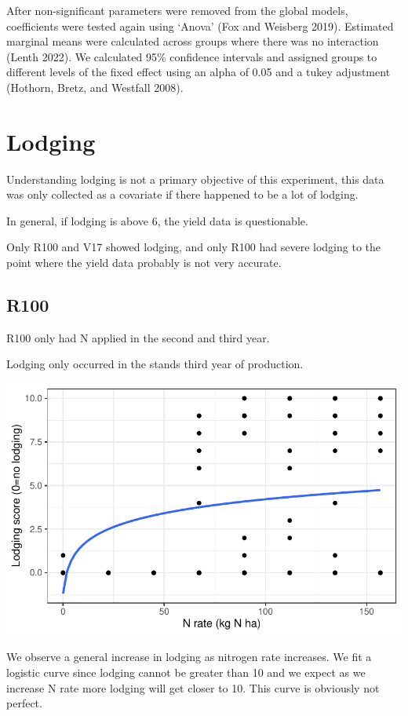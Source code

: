\documentclass[
  letterpaper,
  DIV=11,
  numbers=noendperiod]{scrartcl}
\begin{document}
After non-significant parameters were removed from the global models,
coefficients were tested again using `Anova' (Fox and Weisberg 2019).
Estimated marginal means were calculated across groups where there was
no interaction (Lenth 2022). We calculated 95\% confidence intervals and
assigned groups to different levels of the fixed effect using an alpha
of 0.05 and a tukey adjustment (Hothorn, Bretz, and Westfall 2008).

\hypertarget{lodging}{%
\section{Lodging}\label{lodging}}

Understanding lodging is not a primary objective of this experiment,
this data was only collected as a covariate if there happened to be a
lot of lodging.

In general, if lodging is above 6, the yield data is questionable.

Only R100 and V17 showed lodging, and only R100 had severe lodging to
the point where the yield data probably is not very accurate.

\hypertarget{r100-1}{%
\subsection{R100}\label{r100-1}}

R100 only had N applied in the second and third year.

Lodging only occurred in the stands third year of production.

\includegraphics{nrate_draft_files/figure-pdf/unnamed-chunk-4-1.pdf}

We observe a general increase in lodging as nitrogen rate increases. We
fit a logistic curve since lodging cannot be greater than 10 and we
expect as we increase N rate more lodging will get closer to 10. This
curve is obviously not perfect.
\end{document}
